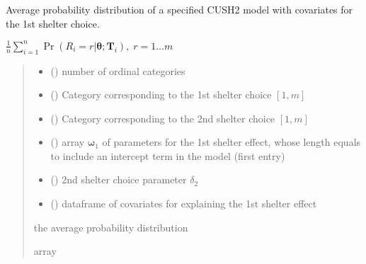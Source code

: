 \documentclass[letterpaper,10pt,english]{sphinxmanual}
\begin{document}
\begin{fulllineitems}
\label{\detokenize{cubmods:cubmods.cush2_x0.pmf}}
\pysigstartsignatures
{}
\pysigstopsignatures
\sphinxAtStartPar
Average probability distribution of a specified CUSH2 model with covariates
for the 1st shelter choice.

\sphinxAtStartPar
\(\frac{1}{n} \sum_{i=1}^n \Pr(R_i=r|\pmb\theta; \pmb T_i),\; r=1 \ldots m\)
\begin{quote}\begin{description}
\begin{itemize}
\item {} 
\sphinxAtStartPar
{} () \textendash{} number of ordinal categories

\item {} 
\sphinxAtStartPar
{} () \textendash{} Category corresponding to the 1st shelter choice \([1,m]\)

\item {} 
\sphinxAtStartPar
{} () \textendash{} Category corresponding to the 2nd shelter choice \([1,m]\)

\item {} 
\sphinxAtStartPar
{} () \textendash{} array \(\pmb \omega_1\) of parameters for the 1st shelter effect, whose length equals 
 to include an intercept term in the model (first entry)

\item {} 
\sphinxAtStartPar
{} () \textendash{} 2nd shelter choice parameter \(\delta_2\)

\item {} 
\sphinxAtStartPar
{} () \textendash{} dataframe of covariates for explaining the 1st shelter effect

\end{itemize}

\sphinxAtStartPar
the average probability distribution

\sphinxAtStartPar
array

\end{description}\end{quote}

\end{fulllineitems}
\end{document}
